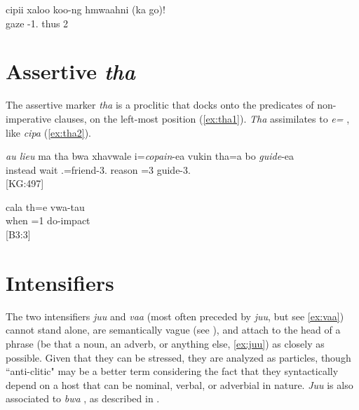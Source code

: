 \ea \label{ex:cipi}
\gll cipii xaloo koo-ng hmwaahni (ka go)! \\
  gaze -1. thus  2\\
\glt {}
\z

\section{Assertive \textit{tha}}
\label{sec:WCAssertive}

The assertive marker \textit{tha} is a proclitic that docks onto the predicates of non-imperative clauses, on the left-most position (\ref{ex:tha1}). \textit{Tha} assimilates to \textit{e=} , like \textit{cipa}  (\ref{ex:tha2}). %



\begin{exe}[(999)]
\ex \label{ex:tha1}
\gll \textit{au lieu} ma tha bwa xhavwale i=\textit{copain}-ea vukin tha=a bo \textit{guide}-ea\\
 instead    wait .=friend-3. reason =3  guide-3.\\
\glt {} {[KG:497]}
\end{exe}


\ea\label{ex:tha2}
\gll cala th=e vwa-tau \\
 when =1 do-impact\\
\glt {} {[B3:3]}
\z

\section{Intensifiers}
\label{sec:WCIntensifiers}

The two intensifiers \textit{juu}  and \textit{vaa}  (most often preceded by \textit{juu}, but see \ref{ex:vaa}) cannot stand alone, are semantically vague (see ), and attach to the head of a phrase (be that a noun, an adverb, or anything else, \ref{ex:juu}) as closely as possible. Given that they can be stressed, they are analyzed as particles, though ``anti-clitic" may be a better term considering the fact that they syntactically depend on a host that can be nominal, verbal, or adverbial in nature. \textit{Juu} is also associated to \textit{bwa} , as described in .



